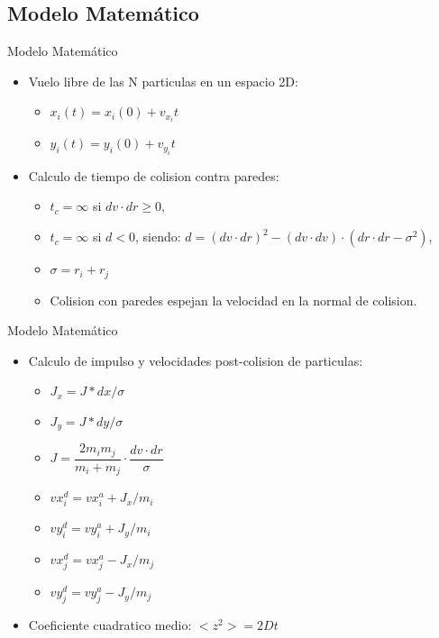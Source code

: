 \documentclass{beamer}
\begin{document}
\subsection{Modelo Matemático}
\begin{frame}{Modelo Matemático}
  \begin{itemize}
    \item Vuelo libre de las N particulas en un espacio 2D:
    \begin{itemize}
      \item $x_i(t) = x_i(0) + v_{x_i} t$
      \item $y_i(t) = y_i(0) + v_{y_i} t$
    \end{itemize}
    \item Calculo de tiempo de colision contra paredes:
    \begin{itemize}
      \item $t_{c} = \infty$ si $dv \cdot dr \geqslant 0$,
      \item $t_{c} = \infty$ si $d < 0$, siendo: $d = (dv \cdot dr)^2 - (dv \cdot dv)\cdot(dr \cdot dr - \sigma^2 )$,
      \item $\sigma = r_i + r_j$
      \item Colision con paredes espejan la velocidad en la normal de colision.
    \end{itemize}
  \end{itemize}
\end{frame}

\begin{frame}{Modelo Matemático}
  \begin{itemize}
    \item Calculo de impulso y velocidades post-colision de particulas:
      \begin{itemize}
        \item $J_x = J*dx/\sigma$
        \item $J_y = J*dy/\sigma$
        \item $J = \dfrac{2 m_i m_j}{m_i + m_j} \cdot \dfrac{dv \cdot dr}{\sigma}$
        \item $vx_i^d = vx_i^a + J_x/m_i$
        \item $vy_i^d = vy_i^a + J_y/m_i$
        \item $vx_j^d = vx_j^a - J_x/m_j$
        \item $vy_j^d = vy_j^a - J_y/m_j$
      \end{itemize}
    \item Coeficiente cuadratico medio: $<z^2> = 2Dt$
  \end{itemize}
\end{frame}
\end{document}
